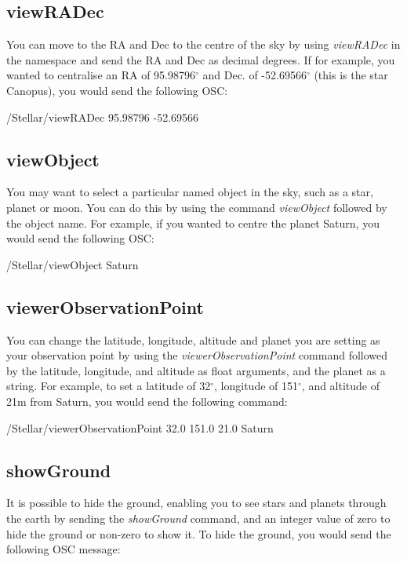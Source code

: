 \subsection{viewRADec} 
You can move to the RA and Dec to the centre of the sky by using  \textit{viewRADec} in the namespace and send the RA and Dec as decimal degrees. If for example, you wanted to centralise  an RA of 95.98796$^{\circ}$  and Dec. of -52.69566$^{\circ}$  (this is the star Canopus), you would send the following OSC:
 \begin{syntax}	
 	\medskip
 	/Stellar/viewRADec 95.98796 -52.69566
 	\medskip
 \end{syntax}
 
 \subsection{viewObject}  
 You may want to select a particular named object in the sky, such as a star, planet or moon. You can do this by using the command \textit{viewObject} followed by the object name. For example, if you wanted to centre the planet Saturn, you would send the following OSC:
 
\begin{syntax}	
 	\medskip
 	 /Stellar/viewObject Saturn
 	\medskip
 \end{syntax}
 
 \subsection{viewerObservationPoint} 
 You can change the latitude, longitude, altitude and planet you are setting as your observation point by using the \textit{viewerObservationPoint} command followed by the latitude, longitude, and altitude as float arguments, and the planet as a string.  For example, to set a latitude of 32$^{\circ}$, longitude of 151$^{\circ}$, and altitude of 21m from Saturn, you would send the following command:
 
 \begin{syntax}	
 	\medskip
 	/Stellar/viewerObservationPoint 32.0 151.0 21.0 Saturn
 	\medskip
 \end{syntax}
 
 
 \subsection{showGround }
 It is possible to hide the ground, enabling you to see stars and planets through the earth by sending the \textit{showGround } command, and an integer value of zero to hide the ground or non-zero to show it. To hide the ground, you would send the following OSC message:
 
